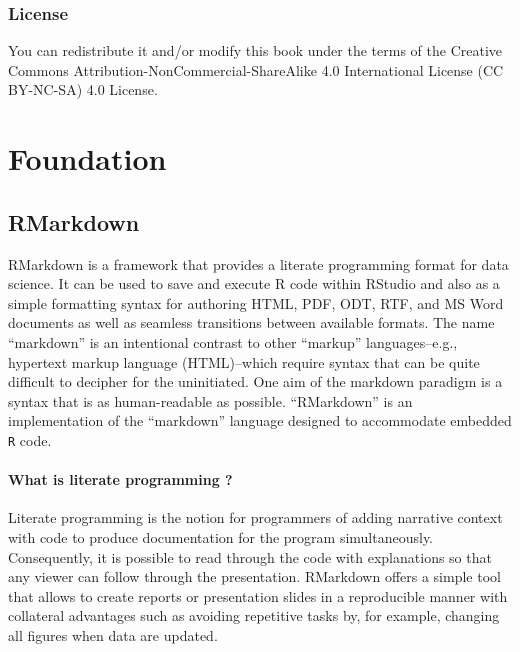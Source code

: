 \documentclass[12pt,]{krantz}
\begin{document}
\section{License}\label{license}

You can redistribute it and/or modify this book under the terms of the
Creative Commons Attribution-NonCommercial-ShareAlike 4.0 International
License (CC BY-NC-SA) 4.0 License.

\part{Foundation}\label{part-foundation}

\chapter{RMarkdown}\label{rmarkdown}

RMarkdown is a framework that provides a literate programming format for
data science. It can be used to save and execute R code within RStudio
and also as a simple formatting syntax for authoring HTML, PDF, ODT,
RTF, and MS Word documents as well as seamless transitions between
available formats. The name ``markdown'' is an intentional contrast to
other ``markup'' languages--e.g., hypertext markup language
(HTML)--which require syntax that can be quite difficult to decipher for
the uninitiated. One aim of the markdown paradigm is a syntax that is as
human-readable as possible. ``RMarkdown'' is an implementation of the
``markdown'' language designed to accommodate embedded \texttt{R} code.

\subsection*{\texorpdfstring{What is \textbf{literate} programming
?}{What is literate programming ?}}\label{what-is-literate-programming}

Literate programming is the notion for programmers of adding narrative
context with code to produce documentation for the program
simultaneously. Consequently, it is possible to read through the code
with explanations so that any viewer can follow through the
presentation. RMarkdown offers a simple tool that allows to create
reports or presentation slides in a reproducible manner with collateral
advantages such as avoiding repetitive tasks by, for example, changing
all figures when data are updated.
\end{document}
